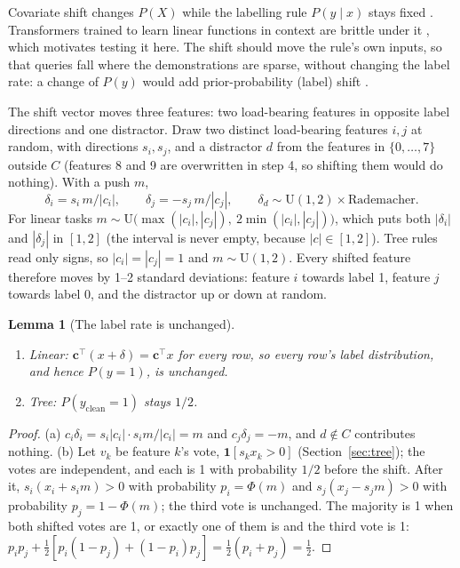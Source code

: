 \documentclass[11pt,a4paper]{article}
\newcommand{\1}{\mathbf{1}}
\theoremstyle{plain}
\newtheorem{lemma}[theorem]{Lemma}
\theoremstyle{definition}
\theoremstyle{remark}
\begin{document}
Covariate shift changes $P(X)$ while the labelling rule $P(y \mid x)$ stays
fixed \citep{shimodaira2000improving,morenotorres2012unifying}. Transformers
trained to learn linear functions in context are brittle under it
\citep{zhang2024trained}, which motivates testing it here. The shift should
move the rule's own inputs, so that queries fall where the demonstrations
are sparse, without changing the label rate: a change of $P(y)$ would add
prior-probability (label) shift \citep{morenotorres2012unifying}.

The shift vector moves three features: two load-bearing features in
opposite label directions and one distractor. Draw two distinct
load-bearing features $i, j$ at random, with directions $s_i, s_j$, and a
distractor $d$ from the features in $\{0,\ldots,7\}$ outside $C$ (features 8
and 9 are overwritten in step 4, so shifting them would do nothing). With a push
$m$,
\[
  \delta_i = s_i\, m / |c_i|, \qquad
  \delta_j = -s_j\, m / |c_j|, \qquad
  \delta_d \sim \text{U}(1,2) \times \text{Rademacher}.
\]
For linear tasks $m \sim \text{U}\big(\max(|c_i|,|c_j|),\ 2\min(|c_i|,|c_j|)\big)$,
which puts both $|\delta_i|$ and $|\delta_j|$ in $[1, 2]$ (the interval is
never empty, because $|c| \in [1,2]$). Tree rules read only signs, so
$|c_i| = |c_j| = 1$ and $m \sim \text{U}(1,2)$. Every shifted feature
therefore moves by 1--2 standard deviations: feature $i$ towards label 1,
feature $j$ towards label 0, and the distractor up or down at random.

\begin{lemma}[The label rate is unchanged]
\label{lem:covariate-neutral}
\begin{enumerate}[nosep,label=(\alph*)]
  \item Linear: $\mathbf{c}^\top(x + \delta) = \mathbf{c}^\top x$ for every
        row, so every row's label distribution, and hence $P(y=1)$, is
        unchanged.
  \item Tree: $P(y_{\mathrm{clean}} = 1)$ stays $1/2$.
\end{enumerate}
\end{lemma}
\begin{proof}
(a) $c_i\delta_i = s_i|c_i| \cdot s_i m/|c_i| = m$ and $c_j\delta_j = -m$,
and $d \notin C$ contributes nothing. (b) Let $v_k$ be feature $k$'s vote,
$\1[s_k x_k > 0]$ (Section~\ref{sec:tree}); the votes are independent, and
each is 1 with probability $1/2$ before the shift. After it,
$s_i(x_i + s_i m) > 0$ with probability $p_i = \Phi(m)$ and
$s_j(x_j - s_j m) > 0$ with probability $p_j = 1 - \Phi(m)$; the third vote
is unchanged. The majority is 1 when both shifted votes are 1, or exactly
one of them is and the third vote is 1:
$p_i p_j + \tfrac12[p_i(1-p_j) + (1-p_i)p_j] = \tfrac12(p_i + p_j) = \tfrac12$.
\end{proof}
\end{document}
